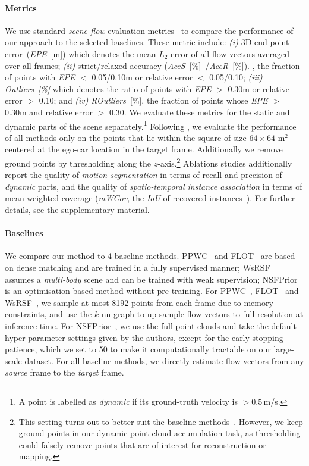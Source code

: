 
\paragraph{Metrics}
We use standard \emph{scene flow} evaluation metrics~\cite{liu2019flownet3d,baur2021slim} to compare the performance of our approach to the selected baselines. These metric include:
\textit{(i)} 3D end-point-error~(\textit{EPE}~[m]) which denotes the mean $L_2$-error of all flow vectors averaged over all frames; 
\textit{(ii)} strict/relaxed accuracy (\textit{AccS}~[\%]~/\textit{AccR}~[\%]). \ie, the fraction of points with \textit{EPE} $<$ 0.05/0.10m or relative error $<$ 0.05/0.10; \textit{(iii)} \textit{Outliers~[\%]} which denotes the ratio of points with \textit{EPE} $>$ 0.30m or relative error $>$ 0.10; and \textit{(iv)} \textit{ROutliers}~[\%], the fraction of points whose \textit{EPE} $>$ 0.30m and relative error $>$ 0.30. We evaluate these metrics for the static and dynamic parts of the scene separately.\footnote{A point is labelled as \textit{dynamic} if its ground-truth velocity is $>0.5\,$m/s.} %
Following \cite{wu2020motionnet,luo2021self}, we evaluate the performance of all methods only on the points that lie within the square of size $64\times 64$ m$^2$ centered at the ego-car location in the target frame. Additionally we remove ground points by thresholding along the $z$-axis.\footnote{This setting turns out to better suit the baseline methods~\cite{puy2020flot,wu2019pointpwc,li2021neural}. However, we keep ground points in our dynamic point cloud accumulation task, as thresholding could falsely remove points that are of interest for reconstruction or mapping.} Ablations studies additionally report the quality of \textit{motion segmentation} in terms of recall and precision of \textit{dynamic} parts, and the quality of \textit{spatio-temporal instance association} in terms of mean weighted coverage (\textit{mWCov}, the \textit{IoU} of recovered instances~\cite{wang2019associatively}). For further details, see the supplementary material.

\paragraph{Baselines}
We compare our method to 4 baseline methods. PPWC~\cite{wu2019pointpwc} and FLOT~\cite{puy2020flot} are based on dense matching and are trained in a fully supervised manner; WsRSF~\cite{gojcic2021weakly} assumes a \textit{multi-body} scene and can be trained with weak supervision; NSFPrior~\cite{li2021neural} is an optimisation-based method without pre-training. For PPWC~\cite{wu2019pointpwc}, FLOT~\cite{puy2020flot} and WsRSF~\cite{gojcic2021weakly}, we sample at most 8192 points from each frame due to memory constraints, and use the $k$-nn graph to up-sample flow vectors to full resolution at inference time. For NSFPrior~\cite{li2021neural}, we use the full point clouds and take the default hyper-parameter settings given by the authors, except for the early-stopping patience, which we set to 50 to make it computationally tractable on our large-scale dataset. For all baseline methods, we directly estimate flow vectors from any \textit{source} frame to the \textit{target} frame. 

